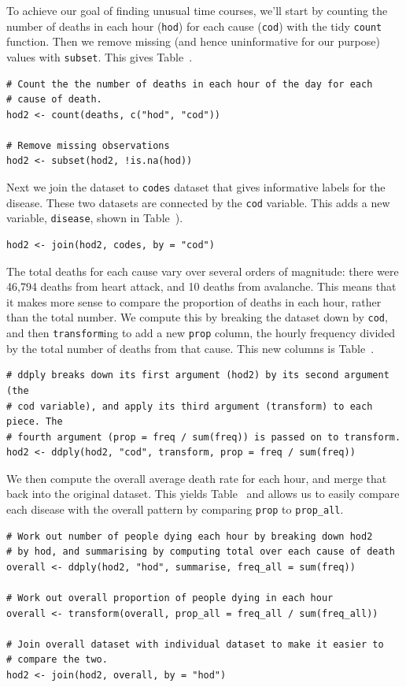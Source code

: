\documentclass[article]{jss}
\begin{document}
To achieve our goal of finding unusual time courses, we'll start by counting the number of deaths in each hour ({\tt hod}) for each cause ({\tt cod}) with the tidy {\tt count} function. Then we remove missing (and hence uninformative for our purpose) values with {\tt subset}. This gives Table~.

\begin{verbatim}
# Count the the number of deaths in each hour of the day for each 
# cause of death.  
hod2 <- count(deaths, c("hod", "cod"))

# Remove missing observations
hod2 <- subset(hod2, !is.na(hod))
\end{verbatim}

Next we join the dataset to {\tt codes} dataset that gives informative labels for the disease. These two datasets are connected by the {\tt cod} variable. This adds a new variable, {\tt disease}, shown in Table~).

\begin{verbatim}
hod2 <- join(hod2, codes, by = "cod")
\end{verbatim}

The total deaths for each cause vary over several orders of magnitude: there were 46,794 deaths from heart attack, and 10 deaths from avalanche. This means that it makes more sense to compare the proportion of deaths in each hour, rather than the total number. We compute this by breaking the dataset down by {\tt cod}, and then {\tt transform}ing to add a new {\tt prop} column, the hourly frequency divided by the total number of deaths from that cause. This new columns is Table~.

\begin{verbatim}
# ddply breaks down its first argument (hod2) by its second argument (the
# cod variable), and apply its third argument (transform) to each piece. The
# fourth argument (prop = freq / sum(freq)) is passed on to transform.
hod2 <- ddply(hod2, "cod", transform, prop = freq / sum(freq))
\end{verbatim}

We then compute the overall average death rate for each hour, and merge that back into the original dataset. This yields Table~ and allows us to easily compare each disease with the overall pattern by comparing {\tt prop} to {\tt prop\_all}.

\begin{verbatim}
# Work out number of people dying each hour by breaking down hod2
# by hod, and summarising by computing total over each cause of death
overall <- ddply(hod2, "hod", summarise, freq_all = sum(freq))

# Work out overall proportion of people dying in each hour
overall <- transform(overall, prop_all = freq_all / sum(freq_all))

# Join overall dataset with individual dataset to make it easier to
# compare the two.
hod2 <- join(hod2, overall, by = "hod")
\end{verbatim}
\end{document}
